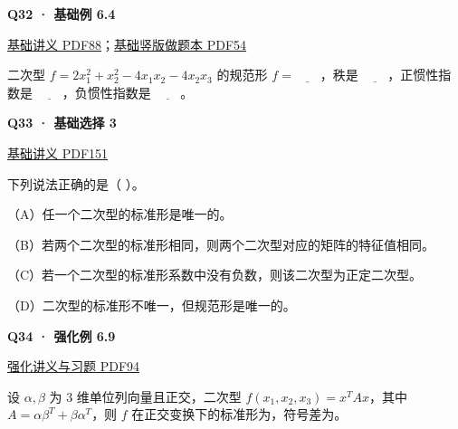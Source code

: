 \documentclass[UTF8,fontset=fandol,11pt,a4paper]{ctexart}
\newcommand{\source}[1]{{\footnotesize\color{Muted}#1\par}}
\newcommand{\qtitle}[2]{\par\needspace{5\baselineskip}\hypertarget{#1}{}\label{#1}\textbf{#2}\par}
\begin{document}
\begin{minipage}{\linewidth}
\qtitle{B-EX-04}{Q32 · 基础例 6.4}
\source{\href{file:///Users/skyintelligence/Desktop/\%E5\%BE\%97\%E8\%AF\%BB\%E4\%B8\%AA\%E7\%A0\%94-\%E5\%8C\%97\%E5\%A4\%A7\%E8\%BD\%AF\%E5\%BE\%AE/\%E6\%95\%B0\%E5\%AD\%A6\%20150/\%E8\%AE\%B2\%E4\%B9\%89/\%E3\%80\%90\%E4\%B8\%80\%E9\%AB\%98\%E6\%95\%B0Kira\%E3\%80\%9127\%E8\%80\%83\%E7\%A0\%94\%E7\%BA\%BF\%E4\%BB\%A3\%E5\%9F\%BA\%E7\%A1\%80\%E8\%AE\%B2\%E4\%B9\%89\%26\%E4\%B9\%A0\%E9\%A2\%98-\%E7\%94\%B5\%E5\%AD\%90\%E7\%89\%88.pdf\#page=88}{基础讲义 PDF88}；\href{file:///Users/skyintelligence/Desktop/\%E5\%BE\%97\%E8\%AF\%BB\%E4\%B8\%AA\%E7\%A0\%94-\%E5\%8C\%97\%E5\%A4\%A7\%E8\%BD\%AF\%E5\%BE\%AE/\%E6\%95\%B0\%E5\%AD\%A6\%20150/\%E8\%AE\%B2\%E4\%B9\%89/\%E3\%80\%90\%E7\%AB\%96\%E7\%89\%88\%E3\%80\%9127\%E8\%80\%83\%E7\%A0\%94Kira\%E7\%BA\%BF\%E4\%BB\%A3\%E5\%9F\%BA\%E7\%A1\%80\%E8\%AE\%B2\%E4\%B9\%89\%E5\%81\%9A\%E9\%A2\%98\%E6\%9C\%AC\%281\%29.pdf\#page=54}{基础竖版做题本 PDF54}}
二次型 $f=2x_1^2+x_2^2-4x_1x_2-4x_2x_3$ 的规范形 $f=\underline{\qquad}$，秩是 $\underline{\qquad}$，正惯性指数是 $\underline{\qquad}$，负惯性指数是 $\underline{\qquad}$。
\end{minipage}\par\vspace{7mm}
\begin{minipage}{\linewidth}
\qtitle{B-MC-03}{Q33 · 基础选择 3}
\source{\href{file:///Users/skyintelligence/Desktop/\%E5\%BE\%97\%E8\%AF\%BB\%E4\%B8\%AA\%E7\%A0\%94-\%E5\%8C\%97\%E5\%A4\%A7\%E8\%BD\%AF\%E5\%BE\%AE/\%E6\%95\%B0\%E5\%AD\%A6\%20150/\%E8\%AE\%B2\%E4\%B9\%89/\%E3\%80\%90\%E4\%B8\%80\%E9\%AB\%98\%E6\%95\%B0Kira\%E3\%80\%9127\%E8\%80\%83\%E7\%A0\%94\%E7\%BA\%BF\%E4\%BB\%A3\%E5\%9F\%BA\%E7\%A1\%80\%E8\%AE\%B2\%E4\%B9\%89\%26\%E4\%B9\%A0\%E9\%A2\%98-\%E7\%94\%B5\%E5\%AD\%90\%E7\%89\%88.pdf\#page=151}{基础讲义 PDF151}}
下列说法正确的是（ ）。

（A）任一个二次型的标准形是唯一的。

（B）若两个二次型的标准形相同，则两个二次型对应的矩阵的特征值相同。

（C）若一个二次型的标准形系数中没有负数，则该二次型为正定二次型。

（D）二次型的标准形不唯一，但规范形是唯一的。
\end{minipage}\par\vspace{7mm}
\begin{minipage}{\linewidth}
\qtitle{R-EX-09}{Q34 · 强化例 6.9}
\source{\href{file:///Users/skyintelligence/Desktop/\%E5\%BE\%97\%E8\%AF\%BB\%E4\%B8\%AA\%E7\%A0\%94-\%E5\%8C\%97\%E5\%A4\%A7\%E8\%BD\%AF\%E5\%BE\%AE/\%E6\%95\%B0\%E5\%AD\%A6\%20150/Kira\%C2\%B727\%E7\%BA\%BF\%E6\%80\%A7\%E4\%BB\%A3\%E6\%95\%B0\%E5\%BC\%BA\%E5\%8C\%96\%E8\%AE\%B2\%E4\%B9\%89\%2B\%E4\%B9\%A0\%E9\%A2\%98.pdf\#page=94}{强化讲义与习题 PDF94}}
设 $\alpha,\beta$ 为 3 维单位列向量且正交，二次型 $f(x_1,x_2,x_3)=x^TAx$，其中 $A=\alpha\beta^T+\beta\alpha^T$，则 $f$ 在正交变换下的标准形为\underline{\hspace{3cm}}，符号差为\underline{\hspace{1.5cm}}。
\end{minipage}\par\vspace{7mm}
\end{document}
